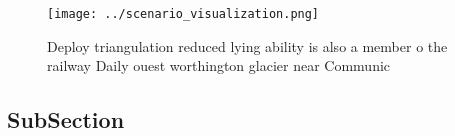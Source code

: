 \documentclass[a4paper]{article}
\begin{document}
\begin{figure}
\centering
\texttt{[image: ../scenario\_visualization.png]}
\caption{Deploy triangulation reduced lying ability is also a member o the railway Daily ouest worthington glacier near Communic
}
\end{figure}
 
\subsection{SubSection}
\end{document}
